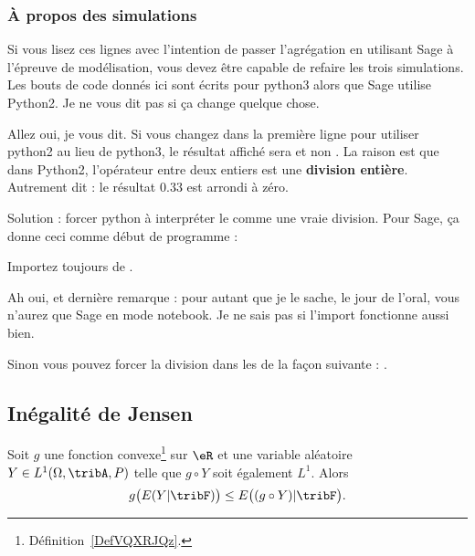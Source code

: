 \subsubsection{À propos des simulations}

Si vous lisez ces lignes avec l'intention de passer l'agrégation en utilisant Sage à l'épreuve de modélisation, vous devez être capable de refaire les trois simulations. Les bouts de code donnés ici sont écrits pour python3 alors que Sage utilise Python2. Je ne vous dit pas si ça change quelque chose.

Allez oui, je vous dit. Si vous changez dans  la première ligne pour utiliser python2 au lieu de python3, le résultat affiché sera  et non . La raison est que dans Python2, l'opérateur \info{/} entre deux entiers est une {\bf division entière}. Autrement dit : le résultat \( 0.33\) est arrondi à zéro.

Solution : forcer python à interpréter le \info{/} comme une vraie division. Pour Sage, ça donne ceci comme début de programme :



Importez toujours  de .

Ah oui, et dernière remarque : pour autant que je le sache, le jour de l'oral, vous n'aurez que Sage en mode notebook. Je ne sais pas si l'import fonctionne aussi bien.

Sinon vous pouvez forcer la division dans les  de la façon suivante : .

\subsection{Inégalité de Jensen}

\begin{proposition}    \label{PropABtKbBo}
    Soit \( g\) une fonction convexe\footnote{Définition~\ref{DefVQXRJQz}.} sur \( \eR\) et une variable aléatoire \( Y\in L^1(\Omega,\tribA,P)\) telle que \( g\circ Y\) soit également \( L^1\). Alors
    \begin{equation}
        g\big( E(Y|\tribF) \big)\leq E\big( (g\circ Y)|\tribF \big).
    \end{equation}
\end{proposition}

